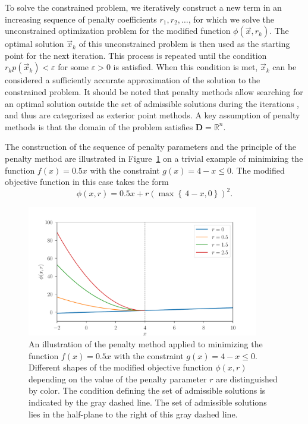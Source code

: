 To solve the constrained problem, we iteratively construct a new term in an increasing sequence of penalty coefficients $ r_1, r_2, \dots$, for which we solve the unconstrained optimization problem for the modified function $ \phi (\vec{x}, r_k)$. The optimal solution $ \vec{x}_k $ of this unconstrained problem is then used as the starting point for the next iteration. This process is repeated until the condition $ r_k p(\vec{x}_k) < \varepsilon$ for some $ \varepsilon > 0$ is satisfied. When this condition is met, $ \vec{x}_k $ can be considered a sufficiently accurate approximation of the solution to the constrained problem. It should be noted that penalty methods allow searching for an optimal solution outside the set of admissible solutions during the iterations \cite{non-linear-textbook}, and thus are categorized as exterior point methods. A key assumption of penalty methods is that the domain of the problem satisfies $ \mathbf{D} = \mathbb{R}^n $.

The construction of the sequence of penalty parameters and the principle of the penalty method are illustrated in Figure~\ref{fig:penalty} on a trivial example of minimizing the function $ f(x) = 0.5x $ with the constraint $ g(x) = 4 - x \leq 0 $. The modified objective function in this case takes the form
\begin{equation}
	\phi (x, r) = 0.5x + r \left(\max  \left\{ \,  4-x, 0 \right\}\right)^2.
\end{equation}
\begin{figure}[H]
	\vspace{-2.25cm}
	\centering
	\includegraphics[width=0.9\textwidth]{figures/penalty.pdf}
	\caption{An illustration of the penalty method applied to minimizing the function $ f(x) = 0.5x $ with the constraint $ g(x) = 4 - x \leq 0 $. Different shapes of the modified objective function $ \phi (x, r) $ depending on the value of the penalty parameter $ r $ are distinguished by color. The condition defining the set of admissible solutions is indicated by the gray dashed line. The set of admissible solutions lies in the half-plane to the right of this gray dashed line.}
	\label{fig:penalty}
\end{figure}


